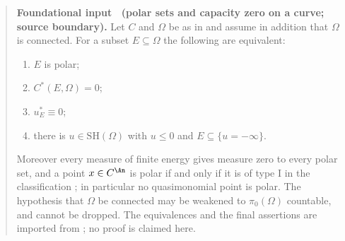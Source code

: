 \label{thm:ch25-thuillier-polar}
\begin{quote}
\textbf{Foundational input \thetheorem\ (polar sets and capacity zero on a
curve; source boundary).}
Let \(C\) and \(\Omega\) be as in  and
assume in addition that \(\Omega\) is connected.  For a subset
\(E\subseteq\Omega\) the following are equivalent:
\begin{enumerate}
\item\label{itm:ch25-thupol:polar} \(E\) is polar;
\item\label{itm:ch25-thupol:cap} \(C^*(E,\Omega)=0\);
\item\label{itm:ch25-thupol:extremal} \(u^*_E\equiv0\);
\item\label{itm:ch25-thupol:single} there is \(u\in\mathrm{SH}(\Omega)\) with
 \(u\leq0\) and \(E\subseteq\{u=-\infty\}\).
\end{enumerate}
Moreover every measure of finite energy gives measure zero to every polar
set, and a point \(x\in C^{\An}\) is polar if and only if it is of type
\(\mathrm{I}\) in the classification ; in
particular no quasimonomial point is polar.  The hypothesis that
\(\Omega\) be connected may be weakened to \(\pi_0(\Omega)\) countable, and
cannot be dropped.
The equivalences and the final assertions are imported from
\cite[Th\'eor\`eme~3.5.11, Proposition~3.4.10 and
Th\'eor\`eme~3.6.11]{Thu05}; no proof is claimed here.
\end{quote}

